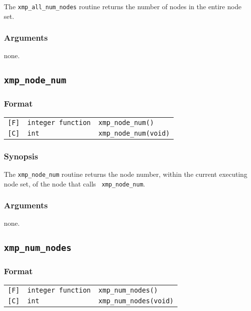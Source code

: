      The {\tt xmp\_all\_num\_nodes} routine returns the number of nodes
     in the entire node set.

\subsubsection*{Arguments}

    none.


\subsection{\tt xmp\_node\_num}

\subsubsection*{Format}

\begin{tabular}{lll}

\verb![F]!&  {\tt integer function}& {\tt xmp\_node\_num()}\\

\verb![C]!&  {\tt int}& {\tt xmp\_node\_num(void)}

\end{tabular}

\subsubsection*{Synopsis}

     The {\tt xmp\_node\_num} routine returns the node number,
     within the current executing node set, of the node that calls {\tt
     xmp\_node\_num}.

\subsubsection*{Arguments}

none.


\subsection{\tt xmp\_num\_nodes}

\subsubsection*{Format}

\begin{tabular}{lll}

\verb![F]!&  {\tt integer function}& {\tt xmp\_num\_nodes()}\\

\verb![C]!&  {\tt int}& {\tt xmp\_num\_nodes(void)}

\end{tabular}

